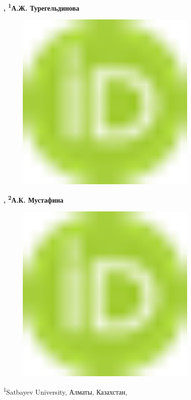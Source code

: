 {\bfseries ,
\textsuperscript{1}А.Ж.
Турегельдинова}
\begin{figure}[H]
	\centering
	\includegraphics[width=0.8\textwidth]{media/ekon2/image1}
	\caption*{}
\end{figure}
{\bfseries ,
\textsuperscript{2}А.К.
Мустафина}
\begin{figure}[H]
	\centering
	\includegraphics[width=0.8\textwidth]{media/ekon2/image1}
	\caption*{}
\end{figure}


\textsuperscript{1}Satbayev University, Алматы, Казахстан,

